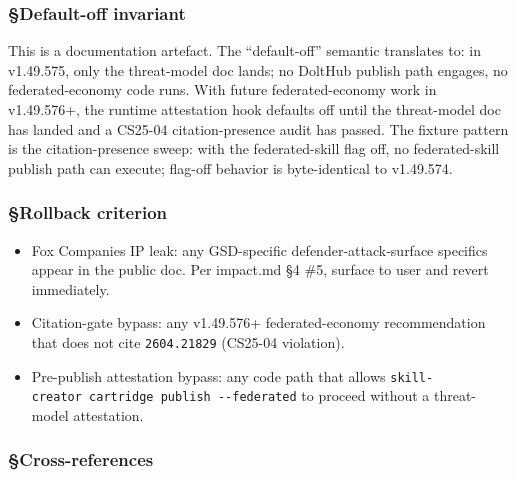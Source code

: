 \documentclass[11pt,letterpaper]{article}
\newcommand{\arxivid}[1]{\texttt{\textcolor{accent}{#1}}}
\providecommand{\tightlist}{\setlength{\itemsep}{0pt}\setlength{\parskip}{0pt}}
\begin{document}
\subsubsection{§Default-off invariant}

This is a documentation artefact. The ``default-off'' semantic
translates to: in v1.49.575, only the threat-model doc lands; no DoltHub
publish path engages, no federated-economy code runs. With future
federated-economy work in v1.49.576+, the runtime attestation hook
defaults off until the threat-model doc has landed and a CS25-04
citation-presence audit has passed. The fixture pattern is the
citation-presence sweep: with the federated-skill flag off, no
federated-skill publish path can execute; flag-off behavior is
byte-identical to v1.49.574.

\subsubsection{§Rollback criterion}

\begin{itemize}
\tightlist
\item
  Fox Companies IP leak: any GSD-specific defender-attack-surface
  specifics appear in the public doc. Per impact.md §4 \#5, surface to
  user and revert immediately.
\item
  Citation-gate bypass: any v1.49.576+ federated-economy recommendation
  that does not cite \arxivid{2604.21829} (CS25-04 violation).
\item
  Pre-publish attestation bypass: any code path that allows
  \texttt{skill-creator\ cartridge\ publish\ -\/-federated} to proceed
  without a threat-model attestation.
\end{itemize}

\subsubsection{§Cross-references}
\end{document}
